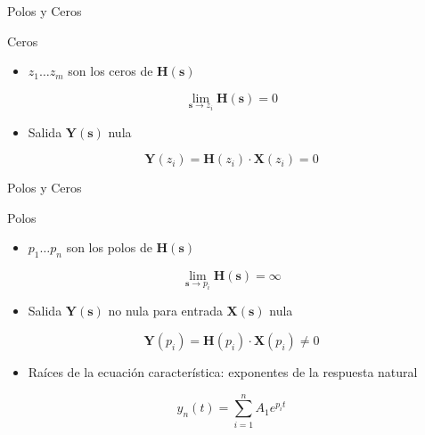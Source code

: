 \documentclass[aspectratio=169, usenames,svgnames,dvipsnames]{beamer}
\newcommand{\laplace}[1]{\mathbf{#1}(\mathbf{s})}
\newcommand{\slp}{\mathbf{s}}
\begin{document}
\begin{frame}[label={sec:org6d156b0}]{Polos y Ceros}
\begin{block}{Ceros}
\begin{itemize}
\item \(z_1 \ldots z_m\) son los ceros de \(\laplace{H}\)
\end{itemize}

\[
\lim_{\slp \to z_i}\laplace{H} = 0
\]

\begin{itemize}
\item Salida \(\laplace{Y}\) nula
\end{itemize}

\[
\mathbf{Y}(z_i) = \mathbf{H}(z_i) \cdot \mathbf{X}(z_i)  = 0
\]
\end{block}
\end{frame}

\begin{frame}[label={sec:orge69f9d8}]{Polos y Ceros}
\begin{block}{Polos}
\begin{itemize}
\item \(p_1 \ldots p_n\) son los polos de \(\laplace{H}\)
\end{itemize}

\[
\lim_{\slp \to p_i}\laplace{H} = \infty
\]

\begin{itemize}
\item Salida \(\laplace{Y}\) no nula para entrada \(\laplace{X}\) nula
\end{itemize}
\[
\mathbf{Y}(p_i) = \mathbf{H}(p_i) \cdot \mathbf{X}(p_i) \neq 0
\]

\begin{itemize}
\item Raíces de la ecuación característica: \alert{exponentes de la respuesta natural}
\end{itemize}

\[
  y_n(t) = \sum_{i = 1}^n A_1 e^{p_i t}
\]
\end{block}
\end{frame}
\end{document}
